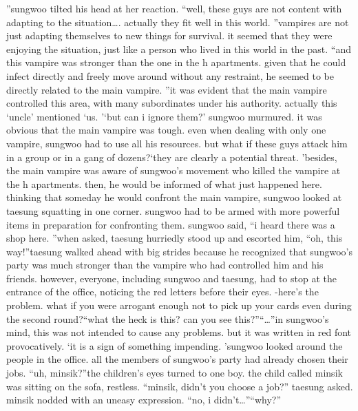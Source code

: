 ”sungwoo tilted his head at her reaction.
“well, these guys are not content with adapting to the situation….
actually they fit well in this world.
”vampires are not just adapting themselves to new things for survival.
 it seemed that they were enjoying the situation, just like a person who lived in this world in the past.
“and this vampire was stronger than the one in the h apartments.
 given that he could infect directly and freely move around without any restraint, he seemed to be directly related to the main vampire.
”it was evident that the main vampire controlled this area, with many subordinates under his authority.
 actually this ‘uncle’ mentioned ‘us.
’‘but can i ignore them?’ sungwoo murmured.
it was obvious that the main vampire was tough.
 even when dealing with only one vampire, sungwoo had to use all his resources.
 but what if these guys attack him in a group or in a gang of dozens?‘they are clearly a potential threat.
’besides, the main vampire was aware of sungwoo’s movement who killed the vampire at the h apartments.
 then, he would be informed of what just happened here.
thinking that someday he would confront the main vampire, sungwoo looked at taesung squatting in one corner.
 sungwoo had to be armed with more powerful items in preparation for confronting them.
sungwoo said, “i heard there was a shop here.
”when asked, taesung hurriedly stood up and escorted him, “oh, this way!”taesung walked ahead with big strides because he recognized that sungwoo’s party was much stronger than the vampire who had controlled him and his friends.
however, everyone, including sungwoo and taesung, had to stop at the entrance of the office, noticing the red letters before their eyes.
-here’s the problem.
 what if you were arrogant enough not to pick up your cards even during the second round?“what the heck is this? can you see this?”“…”in sungwoo’s mind, this was not intended to cause any problems.
 but it was written in red font provocatively.
‘it is a sign of something impending.
’sungwoo looked around the people in the office.
 all the members of sungwoo’s party had already chosen their jobs.
“uh, minsik?”the children’s eyes turned to one boy.
 the child called minsik was sitting on the sofa, restless.
“minsik, didn’t you choose a job?” taesung asked.
 minsik nodded with an uneasy expression.
“no, i didn’t…”“why?”

